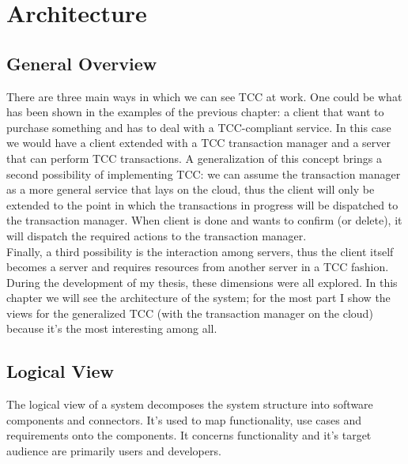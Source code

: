 \chapter{Architecture}

\section{General Overview}
\label{archi-intro}
There are three main ways in which we can see TCC at work. One could be what has been shown in the examples of the previous chapter: a client that want to purchase something and has to deal with a TCC-compliant service. In this case we would have a client extended with a TCC transaction manager and a server that can perform TCC transactions. A generalization of this concept brings a second possibility of implementing TCC: we can assume the transaction manager as a more general service that lays on the cloud, thus the client will only be extended to the point in which the transactions in progress will be dispatched to the transaction manager. When client is done and wants to confirm (or delete), it will dispatch the required actions to the transaction manager.\\
Finally, a third possibility is the interaction among servers, thus the client itself becomes a server and requires resources from another server in a TCC fashion.\\
During the development of my thesis, these dimensions were all explored. In this chapter we will see the architecture of the system; for the most part I show the views for the generalized TCC (with the transaction manager on the cloud) because it's the most interesting among all.

\section{Logical View}
\label{archi-tcc-logical-view}
The logical view of a system decomposes the system structure into software components and connectors. It's used to map functionality, use cases and requirements onto the components. It concerns functionality and it's target audience are primarily users and developers.\\

